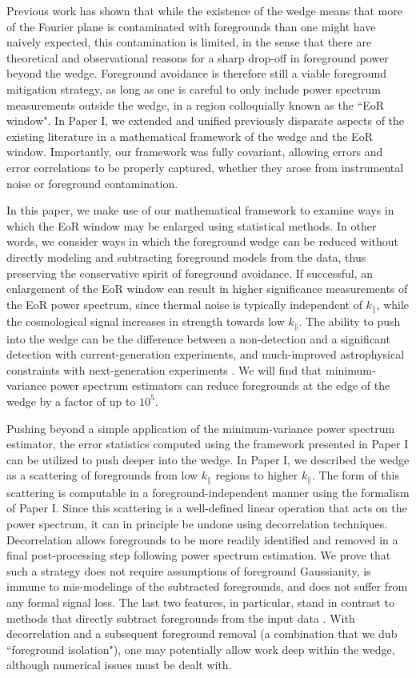 \documentclass[twocolumn,aps,prd,nofootinbib,showpacs]{revtex4-1}
\begin{document}
Previous work has shown that while the existence of the wedge means that more of the Fourier plane is contaminated with foregrounds than one might have naively expected, this contamination is limited, in the sense that there are theoretical and observational reasons for a sharp drop-off in foreground power beyond the wedge.  Foreground avoidance is therefore still a viable foreground mitigation strategy, as long as one is careful to only include power spectrum measurements outside the wedge, in a region colloquially known as the ``EoR window".  In Paper I, we extended and unified previously disparate aspects of the existing literature in a mathematical framework of the wedge and the EoR window.  Importantly, our framework was fully covariant, allowing errors and error correlations to be properly captured, whether they arose from instrumental noise or foreground contamination.

In this paper, we make use of our mathematical framework to examine ways in which the EoR window may be enlarged using statistical methods.  In other words, we consider ways in which the foreground wedge can be reduced without directly modeling and subtracting foreground models from the data, thus preserving the conservative spirit of foreground avoidance.  If successful, an enlargement of the EoR window can result in higher significance measurements of the EoR power spectrum, since thermal noise is typically independent of $k_\parallel$, while the cosmological signal increases in strength towards low $k_\parallel$.  The ability to push into the wedge can be the difference between a non-detection and a significant detection with current-generation experiments, and much-improved astrophysical constraints with next-generation experiments \cite{Pober2014}.  We will find that minimum-variance power spectrum estimators can reduce foregrounds at the edge of the wedge by a factor of up to $10^5$.

Pushing beyond a simple application of the minimum-variance power spectrum estimator, the error statistics computed using the framework presented in Paper I can be utilized to push deeper into the wedge.  In Paper I, we described the wedge as a scattering of foregrounds from low $k_\parallel$ regions to higher $k_\parallel$.  The form of this scattering is computable in a foreground-independent manner using the formalism of Paper I.  Since this scattering is a well-defined linear operation that acts on the power spectrum, it can in principle be undone using decorrelation techniques.  Decorrelation allows foregrounds to be more readily identified and removed in a final post-processing step following power spectrum estimation.  We prove that such a strategy does not require assumptions of foreground Gaussianity, is immune to mis-modelings of the subtracted foregrounds, and does not suffer from any formal signal loss.  The last two features, in particular, stand in contrast to methods that directly subtract foregrounds from the input data \cite{Wang2006,Liu2009a,Bowman2009,Harker2009,Liu2009b,Liu2012}.  With decorrelation and a subsequent foreground removal (a combination that we dub ``foreground isolation"), one may potentially allow work deep within the wedge, although numerical issues must be dealt with.
\end{document}
